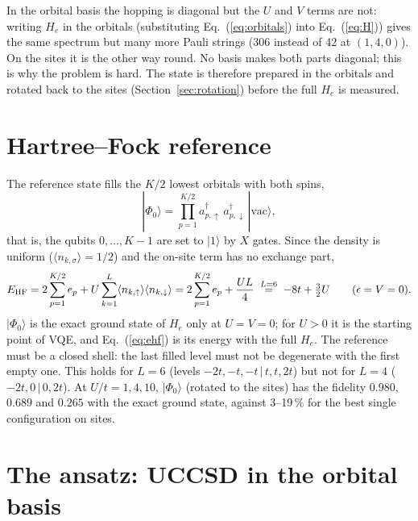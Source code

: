 \documentclass[11pt,a4paper]{article}
\newcommand{\ad}{a^\dagger}
\newcommand{\up}{\uparrow}
\newcommand{\dn}{\downarrow}
\begin{document}
In the orbital basis the hopping is diagonal but the $U$ and $V$ terms are
not: writing $H_e$ in the orbitals (substituting Eq.~(\ref{eq:orbitals}) into
Eq.~(\ref{eq:H})) gives the same spectrum but many more Pauli strings
(306 instead of 42 at $(1,4,0)$). On the sites it is the other way round. No
basis makes both parts diagonal; this is why the problem is hard. The state is
therefore prepared in the orbitals and rotated back to the sites
(Section~\ref{sec:rotation}) before the full $H_e$ is measured.

\section{Hartree--Fock reference}\label{sec:hf}

The reference state fills the $K/2$ lowest orbitals with both spins,
\begin{equation}\label{eq:hf}
  |\Phi_0\rangle = \prod_{p=1}^{K/2} \ad_{p,\up}\, \ad_{p,\dn} \, |\mathrm{vac}\rangle ,
\end{equation}
that is, the qubits $0, \dots, K-1$ are set to $|1\rangle$ by $X$ gates. Since
the density is uniform ($\langle n_{k,\sigma}\rangle = 1/2$) and the on-site term
has no exchange part,
\begin{equation}\label{eq:ehf}
  E_{\rm HF} = 2 \sum_{p=1}^{K/2} e_p + U \sum_{k=1}^{L} \langle n_{k,\up}\rangle\langle n_{k,\dn}\rangle
            = 2 \sum_{p=1}^{K/2} e_p + \frac{UL}{4}
            \;\stackrel{L=6}{=}\; -8t + \tfrac32 U \qquad (\epsilon = V = 0).
\end{equation}
$|\Phi_0\rangle$ is the exact ground state of $H_e$ only at $U = V = 0$; for
$U > 0$ it is the starting point of VQE, and Eq.~(\ref{eq:ehf}) is its energy
with the full $H_e$. The reference must be a closed shell: the last filled level must not be
degenerate with the first empty one. This holds for $L = 6$ (levels
$-2t, -t, -t \,|\, t, t, 2t$) but not for $L = 4$ ($-2t, 0 \,|\, 0, 2t$).
At $U/t = 1, 4, 10$, $|\Phi_0\rangle$ (rotated to the sites) has the fidelity
$0.980$, $0.689$ and $0.265$ with the exact ground state, against 3--19\,\% for
the best single configuration on sites.

\section{The ansatz: UCCSD in the orbital basis}\label{sec:uccsd}
\end{document}
